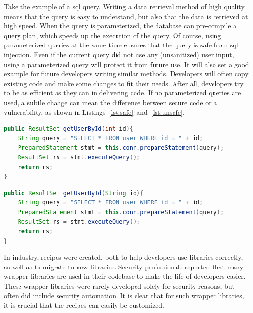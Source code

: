 Take the example of a \gls{sql} query.
Writing a data retrieval method of high quality means that the query is easy to understand, but also that the data is retrieved at high speed.
When the query is parameterized, the database can pre-compile a query plan, which speeds up the execution of the query.
Of course, using parameterized queries at the same time ensures that the query is safe from \gls{sql} injection.
Even if the current query did not use any (unsanitized) user input, using a parameterized query will protect it from future use.
It will also set a good example for future developers writing similar methods.
Developers will often copy existing code and make some changes to fit their needs.
After all, developers try to be as efficient as they can in delivering code.
If no parameterized queries are used, a subtle change can mean the difference between secure code or a vulnerability, as shown in Listings~\ref{lst:safe}~and~\ref{lst:unsafe}.

\begin{lstlisting}[float,language={Java},caption={This method concatenates an integer value to the query. An integer variable can not alter the query, and hence this method can not lead to SQL injection.},
float,label={lst:safe},abovecaptionskip=-0.0pt]
public ResultSet getUserById(int id){
    String query = "SELECT * FROM user WHERE id = " + id;
    PreparedStatement stmt = this.conn.prepareStatement(query);
    ResultSet rs = stmt.executeQuery();
    return rs;
}
\end{lstlisting}

\begin{lstlisting}[language={Java},caption={This method concatenates a String variable to the query. As a result it is vulnerable to SQL injection.}, float,label={lst:unsafe},abovecaptionskip=-0.0pt]
public ResultSet getUserById(String id){
    String query = "SELECT * FROM user WHERE id = " + id;
    PreparedStatement stmt = this.conn.prepareStatement(query);
    ResultSet rs = stmt.executeQuery();
    return rs;
}
\end{lstlisting}

In industry, recipes were created, both to help developers use libraries correctly, as well as to migrate to new libraries.
Security professionals reported that many wrapper libraries are used in their codebase to make the life of developers easier.
These wrapper libraries were rarely developed solely for security reasons, but often did include security automation.
It is clear that for such wrapper libraries, it is crucial that the recipes can easily be customized.

